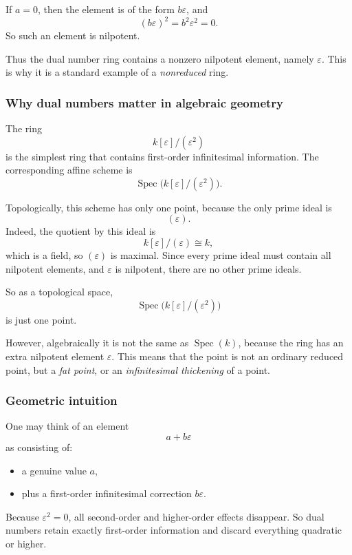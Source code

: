 \documentclass[12pt,a4paper]{article}
\theoremstyle{plain}
\theoremstyle{definition}      %
\begin{document}
	If \(a=0\), then the element is of the form \(b\varepsilon\), and
	\[
	(b\varepsilon)^2=b^2\varepsilon^2=0.
	\]
	So such an element is nilpotent.
	
	Thus the dual number ring contains a nonzero nilpotent element, namely \(\varepsilon\). This is why it is a standard example of a \emph{nonreduced} ring.
	
	\subsubsection*{Why dual numbers matter in algebraic geometry}
	
	The ring
	\[
	k[\varepsilon]/(\varepsilon^2)
	\]
	is the simplest ring that contains first-order infinitesimal information. The corresponding affine scheme is
	\[
	\operatorname{Spec}\bigl(k[\varepsilon]/(\varepsilon^2)\bigr).
	\]
	
	Topologically, this scheme has only one point, because the only prime ideal is
	\[
	(\varepsilon).
	\]
	Indeed, the quotient by this ideal is
	\[
	k[\varepsilon]/(\varepsilon)\cong k,
	\]
	which is a field, so \((\varepsilon)\) is maximal. Since every prime ideal must contain all nilpotent elements, and \(\varepsilon\) is nilpotent, there are no other prime ideals.
	
	So as a topological space,
	\[
	\operatorname{Spec}\bigl(k[\varepsilon]/(\varepsilon^2)\bigr)
	\]
	is just one point.
	
	However, algebraically it is not the same as \(\operatorname{Spec}(k)\), because the ring has an extra nilpotent element \(\varepsilon\). This means that the point is not an ordinary reduced point, but a \emph{fat point}, or an \emph{infinitesimal thickening} of a point.
	
	\subsubsection*{Geometric intuition}
	
	One may think of an element
	\[
	a+b\varepsilon
	\]
	as consisting of:
	
	\begin{itemize}
		\item a genuine value \(a\),
		\item plus a first-order infinitesimal correction \(b\varepsilon\).
	\end{itemize}
	
	Because \(\varepsilon^2=0\), all second-order and higher-order effects disappear. So dual numbers retain exactly first-order information and discard everything quadratic or higher.
	
\end{document}

